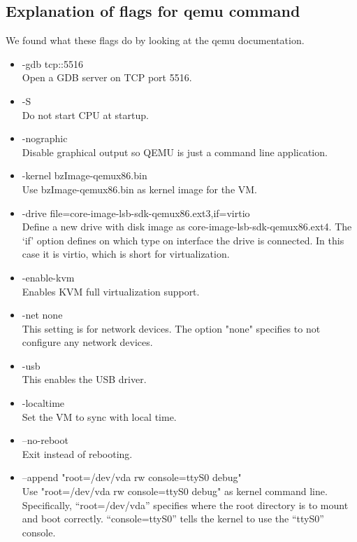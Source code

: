 \documentclass[onecolumn, draftclsnofoot,10pt, compsoc]{IEEEtran}
\begin{document}
\subsection{Explanation of flags for qemu command}
We found what these flags do by looking at the qemu documentation. \cite{qemu_ref}
\begin{itemize}
\item -gdb tcp::5516 \\
Open a GDB server on TCP port 5516.
\item -S \\
Do not start CPU at startup.
\item -nographic \\
Disable graphical output so QEMU is just a command line application.
\item -kernel bzImage-qemux86.bin \\
Use bzImage-qemux86.bin as kernel image for the VM.
\item -drive file=core-image-lsb-sdk-qemux86.ext3,if=virtio \\
Define a new drive with disk image as core-image-lsb-sdk-qemux86.ext4. The ‘if’ option defines on which type on interface the drive is connected. In this case it is virtio, which is short for virtualization.
\item -enable-kvm \\
Enables KVM full virtualization support.
\item -net none \\
This setting is for network devices. The option "none" specifies to not configure any network devices.
\item -usb \\ 
This enables the USB driver.
\item -localtime \\ 
Set the VM to sync with local time.
\item --no-reboot \\
Exit instead of rebooting.
\item --append "root=/dev/vda rw console=ttyS0 debug" \\
Use "root=/dev/vda rw console=ttyS0 debug" as kernel command line. Specifically, “root=/dev/vda” specifies where the root directory is to mount and boot correctly. “console=ttyS0” tells the kernel to use the “ttyS0” console.
\end{itemize}
\end{document}
